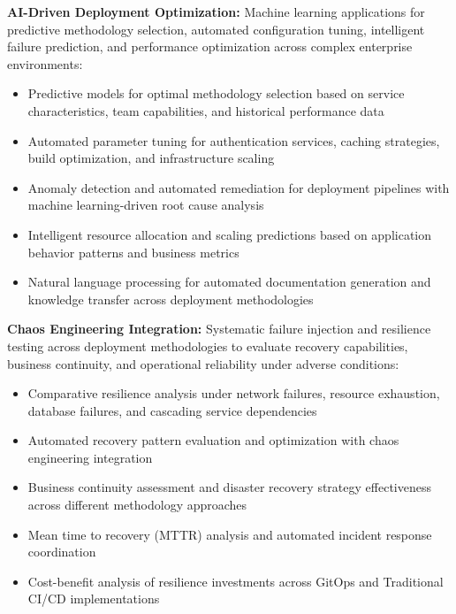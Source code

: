 \textbf{AI-Driven Deployment Optimization:} Machine learning applications for predictive methodology selection, automated configuration tuning, intelligent failure prediction, and performance optimization across complex enterprise environments:
\begin{itemize}
\item Predictive models for optimal methodology selection based on service characteristics, team capabilities, and historical performance data
\item Automated parameter tuning for authentication services, caching strategies, build optimization, and infrastructure scaling
\item Anomaly detection and automated remediation for deployment pipelines with machine learning-driven root cause analysis
\item Intelligent resource allocation and scaling predictions based on application behavior patterns and business metrics
\item Natural language processing for automated documentation generation and knowledge transfer across deployment methodologies
\end{itemize}

\textbf{Chaos Engineering Integration:} Systematic failure injection and resilience testing across deployment methodologies to evaluate recovery capabilities, business continuity, and operational reliability under adverse conditions:
\begin{itemize}
\item Comparative resilience analysis under network failures, resource exhaustion, database failures, and cascading service dependencies
\item Automated recovery pattern evaluation and optimization with chaos engineering integration
\item Business continuity assessment and disaster recovery strategy effectiveness across different methodology approaches
\item Mean time to recovery (MTTR) analysis and automated incident response coordination
\item Cost-benefit analysis of resilience investments across GitOps and Traditional CI/CD implementations
\end{itemize}

